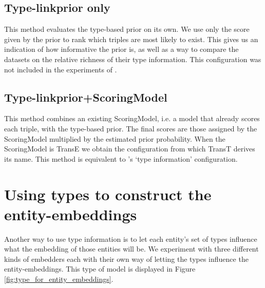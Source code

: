 \subsection{Type-linkprior only}
%
This method evaluates the type-based prior on its own.
We use only the score given by the prior to rank which triples are most likely to exist.
This gives us an indication of how informative the prior is, as well as a way to compare the datasets on the relative richness of their type information.
This configuration was not included in the experiments of \citeauthor{ma2017transt}.


\subsection{Type-linkprior+ScoringModel}
%
This method combines an existing ScoringModel, i.e. a model that already scores each triple, with the type-based prior. The final scores are those assigned by the ScoringModel multiplied by the estimated prior probability.
When the ScoringModel is TransE we obtain the configuration from which TransT derives its name.
This method is equivalent to \citeauthor{ma2017transt}'s `type information' configuration.


\section{Using types to construct the entity-embeddings}
%
Another way to use type information is to let each entity's set of types influence what the embedding of those entities will be. We experiment with three different kinds of embedders each with their own way of letting the types influence the entity-embeddings.
This type of model is displayed in Figure \ref{fig:type_for_entity_embeddings}.

